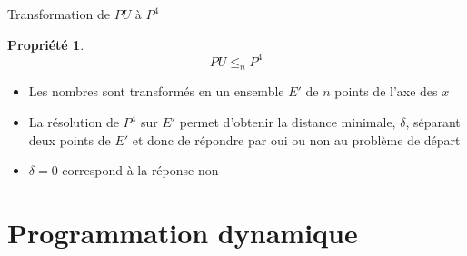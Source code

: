 \documentclass[aspectratio=1610,francais,envcountsect]{beamer}
\newtheorem{property}[theorem]{Propriété}
\begin{document}
\begin{frame}{Transformation de $PU$ à $P^4$}

  \begin{property}
    \begin{equation}
      \label{eq:putri}
      PU \leq_{n} P^4
    \end{equation}
  \end{property}

  \begin{center}
  \end{center}

  \begin{itemize}
    \small
  \item Les nombres sont transformés en un ensemble $E'$ de $n$ points
    de l’axe des $x$
  \item La résolution de $P^4$ sur $E'$ permet d’obtenir la distance
    minimale, $\delta$, séparant deux points de $E'$ et donc de
    répondre par oui ou non au problème de départ
  \item $\delta = 0$ correspond à la réponse non
  \end{itemize}

\end{frame}

\section{Programmation dynamique}
\end{document}
